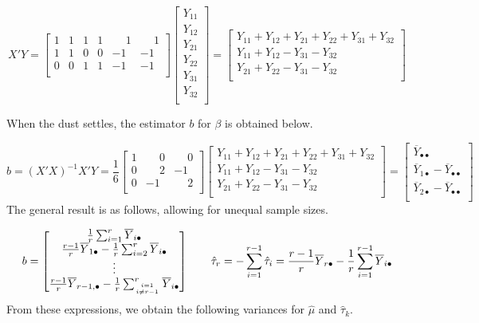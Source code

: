 \documentclass[
]{book}
\begin{document}
\[ 
X'Y = 
\begin{bmatrix}
1 & 1 & 1 & 1 & \phantom{-}1 & \phantom{-}1 \\
1 & 1 & 0 & 0 & -1 & -1 \\
0 & 0 & 1 & 1 & -1 & -1 \\ \end{bmatrix}
\begin{bmatrix}
Y_{11} \\ Y_{12} \\ Y_{21} \\ Y_{22} \\
Y_{31} \\ Y_{32} \\ \end{bmatrix}
=
\begin{bmatrix}
Y_{11}+Y_{12}+Y_{21}+Y_{22}+Y_{31}+Y_{32} \\ 
Y_{11}+Y_{12}-Y_{31}-Y_{32} \\ 
Y_{21}+Y_{22}-Y_{31}-Y_{32}\\ \end{bmatrix}
\]

When the dust settles, the estimator \(b\) for \(\beta\) is obtained
below.

\[
b=\left(X'X\right)^{-1}X'Y =
\frac{1}{6}
\begin{bmatrix}
1 & \phantom{-}0 & \phantom{-}0 \\ 0 & \phantom{-}2 & -1 \\ 0 & -1 & \phantom{-}2 \\
\end{bmatrix}
\begin{bmatrix}
Y_{11}+Y_{12}+Y_{21}+Y_{22}+Y_{31}+Y_{32} \\ 
Y_{11}+Y_{12}-Y_{31}-Y_{32} \\ 
Y_{21}+Y_{22}-Y_{31}-Y_{32}\\ \end{bmatrix}
= 
\begin{bmatrix}
\overline{Y}_{\bullet\bullet} \\
\overline{Y}_{1\bullet} - \overline{Y}_{\bullet\bullet} \\
\overline{Y}_{2\bullet} - \overline{Y}_{\bullet\bullet} \\
\end{bmatrix}
\] The general result is as follows, allowing for unequal sample sizes.

\[
b =
\begin{bmatrix}
\frac{1}{r}\sum_{i=1}^r \overline{Y}_{i\bullet} \\
\frac{r-1}{r}\overline{Y}_{1\bullet}-\frac{1}{r}\sum_{i=2}^r\overline{Y}_{i\bullet} \\
\vdots \\
\frac{r-1}{r}\overline{Y}_{r-1,\bullet}-\frac{1}{r}\sum_{i=1 \atop i \ne r-1}^r\overline{Y}_{i\bullet}
\end{bmatrix}
\qquad
\hat{\tau}_r=-\sum_{i=1}^{r-1}\hat{\tau}_i=
\frac{r-1}{r}\overline{Y}_{r\bullet}-\frac{1}{r}\sum_{i=1}^{r-1}\overline{Y}_{i\bullet}
\] From these expressions, we obtain the following variances for
\(\hat{\mu}\) and \(\hat{\tau}_k\).
\end{document}
